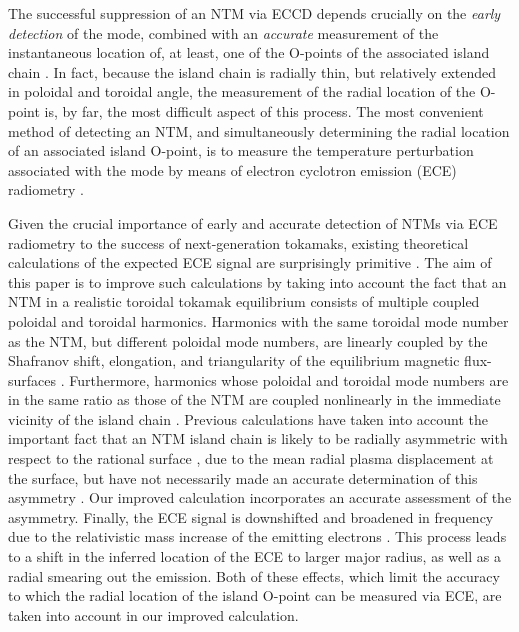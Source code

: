 \documentclass{iopjournal}
\begin{document}
The successful suppression of an NTM via ECCD depends crucially on the {\em early detection}\/ of the mode, combined with an {\em accurate}\/ measurement   of 
the instantaneous location of, at least, one of the O-points  of the associated island chain \cite{eccd6}. In fact, because the island chain is radially thin, 
but relatively extended in poloidal and toroidal angle, the measurement  of the radial location of the O-point is, by far,  the most difficult aspect of
this process. The most convenient method of  detecting an NTM, and simultaneously determining the radial location of an associated island O-point, is to measure the temperature perturbation associated with the mode by means of electron cyclotron emission (ECE) radiometry \cite{ece1,ece2,ntm2,ece4}.

Given the crucial importance of early and accurate detection of NTMs via ECE radiometry to the success of next-generation tokamaks, existing theoretical calculations of
the expected ECE signal are surprisingly primitive \cite{eccd6,ece4,ece4a}. The aim of this paper is to
improve such calculations by taking into account the fact that an NTM  in a realistic toroidal tokamak equilibrium consists of multiple coupled poloidal and toroidal harmonics. Harmonics with the same toroidal mode number as the NTM, but different poloidal mode numbers, are linearly coupled by the
Shafranov shift, elongation, and triangularity of the equilibrium magnetic flux-surfaces \cite{tear2,tear3,tear5}. Furthermore, harmonics whose poloidal and
toroidal mode numbers are in the same ratio as those of the NTM are coupled nonlinearly in the immediate vicinity of the island chain \cite{ntm1,ntm2}.
Previous calculations have taken into account the important fact that an NTM island chain is likely to be radially asymmetric with respect to the rational surface \cite{ece6a,ece6},
due to the mean radial plasma displacement at the  surface, but have not necessarily made an accurate
determination of this asymmetry \cite{eccd6}. Our improved calculation incorporates an accurate assessment of the asymmetry. Finally, the ECE signal 
is downshifted and broadened in frequency due to the relativistic mass increase of the emitting electrons \cite{ece1,ece2,ece5}.  This process leads to a shift in the inferred location
of the ECE  to larger major radius, as well as a radial smearing out the emission. Both of these effects, which limit the accuracy to which the
radial location of the island O-point can be measured via ECE,  are taken into account in our improved calculation.
\end{document}
